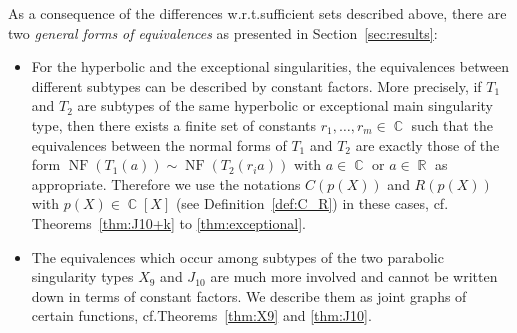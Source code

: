 \documentclass[noend]{amsproc}
\theoremstyle{definition}
\DeclareMathOperator{\R}{\mathbb{R}}
\DeclareMathOperator{\C}{\mathbb{C}}
\DeclareMathOperator{\NF}{NF}
\begin{document}
As a consequence of the differences w.r.t.\@ sufficient sets described above,
there are two \emph{general forms of equivalences} as presented in
Section~\ref{sec:results}:
\begin{itemize}
\item
For the hyperbolic and the exceptional singularities, the equivalences between
different subtypes can be described by constant factors. More precisely, if
$T_1$ and $T_2$ are subtypes of the same hyperbolic or exceptional main
singularity type, then there exists a finite set of constants
$r_1, \ldots, r_m \in \C$ such that the equivalences between the normal forms
of $T_1$ and $T_2$ are exactly those of the form
$\NF(T_1(a)) \sim \NF(T_2(r_i a))$ with $a \in \C$ or $a \in \R$ as
appropriate. Therefore we use the notations $C(p(X))$ and $R(p(X))$ with
$p(X) \in \C[X]$ (see Definition~\ref{def:C_R}) in these cases, cf.\@
Theorems~\ref{thm:J10+k} to \ref{thm:exceptional}.
\item
The equivalences which occur among subtypes of the two parabolic singularity
types $X_9$ and $J_{10}$ are much more involved and cannot be written down in
terms of constant factors. We describe them as joint graphs of certain
functions, cf.\@ Theorems~\ref{thm:X9} and \ref{thm:J10}.
\end{itemize}
\end{document}
